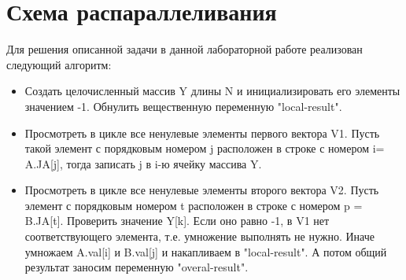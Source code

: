 \documentclass{report}
\begin{document}
\section*{Схема распараллеливания}
\par Для решения описанной задачи в данной лабораторной работе реализован следующий алгоритм:
\begin{itemize}
\item Создать целочисленный массив Y длины N и инициализировать его элементы значением -1. Обнулить вещественную переменную "local-result".
\item Просмотреть в цикле  все ненулевые элементы первого вектора V1. Пусть такой элемент с порядковым номером j расположен в строке с номером i= A.JA[j], тогда записать j в i-ю ячейку массива Y.
\item Просмотреть в цикле все ненулевые элементы второго вектора V2. Пусть элемент с порядковым номером t расположен в строке с номером p = B.JA[t]. Проверить значение Y[k]. Если оно равно -1, в V1 нет соответствующего элемента, т.е. умножение выполнять не нужно.  Иначе умножаем A.val[i] и B.val[j] и накапливаем в "local-result". А потом общий результат заносим переменную "overal-result".
\end{itemize}
\newpage

\end{document}
